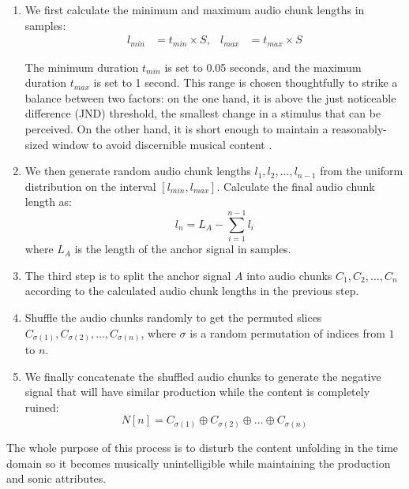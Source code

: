 \begin{enumerate}
\item We first calculate the minimum and maximum audio chunk lengths in samples:
\begin{align}
l_{min} &= t_{min} \times S, &
l_{max} &= t_{max} \times S
\end{align}

The minimum duration $t_{min}$ is set to 0.05 seconds, and the maximum duration $t_{max}$ is set to 1 second. This range is chosen thoughtfully to strike a balance between two factors: on the one hand, it is above the just noticeable difference (JND) threshold, the smallest change in a stimulus that can be perceived. On the other hand, it is short enough to maintain a reasonably-sized window to avoid discernible musical content \cite{Fastl2007Just-NoticeableChanges}.

\item We then generate random audio chunk lengths $l_1, l_2, \ldots, l_{n-1}$ from the uniform distribution on the interval $[l_{min}, l_{max}]$. Calculate the final audio chunk length as:
\begin{equation}
l_n = L_A - \sum_{i=1}^{n-1} l_i
\end{equation}
where $L_A$ is the length of the anchor signal in samples.

\item The third step is to split the anchor signal $A$ into audio chunks $C_1, C_2, \ldots, C_n$ according to the calculated audio chunk lengths in the previous step.

\item Shuffle the audio chunks randomly to get the permuted slices $C_{\sigma(1)}, C_{\sigma(2)}, \ldots, C_{\sigma(n)}$, where $\sigma$ is a random permutation of indices from $1$ to $n$. 

\item We finally concatenate the shuffled audio chunks to generate the negative signal that will have similar production while the content is completely ruined:
\begin{equation}\label{eq:negative_signal}
N[n] = C_{\sigma(1)} \oplus C_{\sigma(2)} \oplus \ldots \oplus C_{\sigma(n)}
\end{equation}
\end{enumerate}

The whole purpose of this process is to disturb the content unfolding in the time domain so it becomes musically unintelligible while maintaining the production and sonic attributes.

